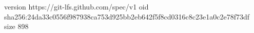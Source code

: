 version https://git-lfs.github.com/spec/v1
oid sha256:24da33c0556f987938ca753d925bb2eb642f5f8cd0316c8c23e1a0c2e78f73df
size 898
